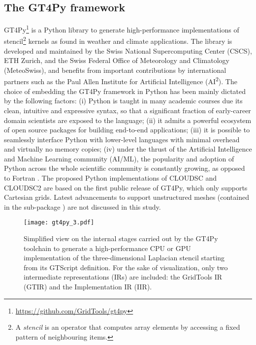 \documentclass[main.tex]{subfiles}
\begin{document}
    \subsection{The GT4Py framework}
    \label{section:gt4py}

        GT4Py\footnote{\url{https://github.com/GridTools/gt4py}} is a Python library to generate high-performance implementations of stencil\footnote{A \emph{stencil} is an operator that computes array elements by accessing a fixed pattern of neighbouring items.} kernels as found in weather and climate applications. The library is developed and maintained by the Swiss National Supercomputing Center (CSCS), ETH Zurich, and the Swiss Federal Office of Meteorology and Climatology (MeteoSwiss), and benefits from important contributions by international partners such as the Paul Allen Institute for Artificial Intelligence (AI\textsuperscript{2}). The choice of embedding the GT4Py framework in Python has been mainly dictated by the following factors: (i) Python is taught in many academic courses due its clean, intuitive and expressive syntax, so that a significant fraction of early-career domain scientists are exposed to the language; (ii) it admits a powerful ecosystem of open source packages for building end-to-end applications; (iii) it is possible to seamlessly interface Python with lower-level languages with minimal overhead and virtually no memory copies; (iv) under the thrust of the Artificial Intelligence and Machine Learning community (AI/ML), the popularity and adoption of Python across the whole scientific community is constantly growing, as opposed to Fortran \citep{shipman23}. The proposed Python implementations of CLOUDSC and CLOUDSC2 are based on the first public release of GT4Py, which only supports Cartesian grids. Latest advancements to support unstructured meshes (contained in the sub-package ) are not discussed in this study.

        \begin{figure}[t!]
            \centering
            \texttt{[image: gt4py\_3.pdf]}
            \caption{Simplified view on the internal stages carried out by the GT4Py toolchain to generate a high-performance CPU or GPU implementation of the three-dimensional Laplacian stencil starting from its GTScript definition. For the sake of visualization, only two intermediate representations (IRs) are included: the GridTools IR (GTIR) and the Implementation IR (IIR). }
            \label{fig:gt4py}
        \end{figure}
\end{document}
